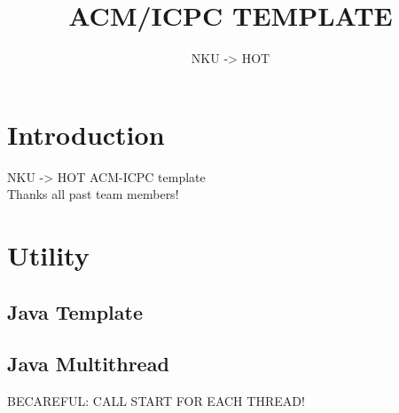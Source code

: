 \documentclass[a4paper]{article}
\begin{document}
  
\title{ACM/ICPC TEMPLATE}  
\author{NKU -> HOT}    
\maketitle
\tableofcontents
\section{Introduction}
NKU -> HOT ACM-ICPC template \\
Thanks all past team members! 
\section{Utility}
\subsection{Java Template}

\subsection{Java Multithread}
BECAREFUL: CALL START FOR EACH THREAD!

\end{document}
